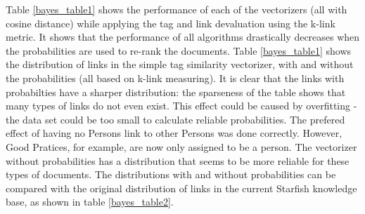 Table \ref{bayes_table1} shows the performance of each of the vectorizers (all with cosine distance) while applying the tag and link devaluation using the k-link metric. It shows that the performance of all algorithms drastically decreases when the probabilities are used to re-rank the documents. Table \ref{bayes_table1}  shows the distribution of links in the simple tag similarity vectorizer, with and without the probabilities (all based on k-link measuring). It is clear that the links with probabilties have a sharper distribution: the sparseness of the table shows that many types of links do not even exist. This effect could be caused by overfitting - the data set could be too small to calculate reliable probabilities. The prefered effect of having no Persons link to other Persons was done correctly. However, Good Pratices, for example, are now only assigned to be a person. The vectorizer without probabilities has a distribution that seems to be more reliable for these types of documents. The distributions with and without probabilities can be compared with the original distribution of links in the current Starfish knowledge base, as shown in table \ref{bayes_table2}.  

